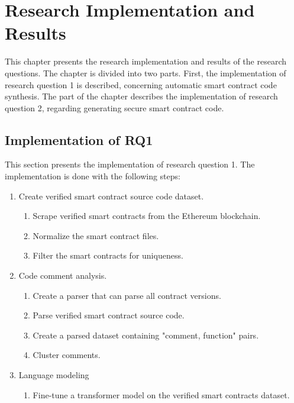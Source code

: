 
\chapter{Research Implementation and Results}
\label{chap:implementation-and-results}
This chapter presents the research implementation and results of the research questions. The chapter is divided into two parts. First, the implementation of research question 1 is described, concerning automatic smart contract code synthesis. The part of the chapter describes the implementation of research question 2, regarding generating secure smart contract code.

\section{Implementation of RQ1}
This section presents the implementation of research question 1. The implementation is done with the following steps:
\begin{enumerate}
    \item Create verified smart contract source code dataset.
    \begin{enumerate}
        \item Scrape verified smart contracts from the Ethereum blockchain.
        \item Normalize the smart contract files.
        \item Filter the smart contracts for uniqueness.
    \end{enumerate}
    \item Code comment analysis.
    \begin{enumerate}
        \item Create a parser that can parse all contract versions.
        \item Parse verified smart contract source code.
        \item Create a parsed dataset containing "comment, function" pairs.
        \item Cluster comments.
    \end{enumerate}
    \item Language modeling
    \begin{enumerate}
        \item Fine-tune a transformer model on the verified smart contracts dataset.
    \end{enumerate}
\end{enumerate}

